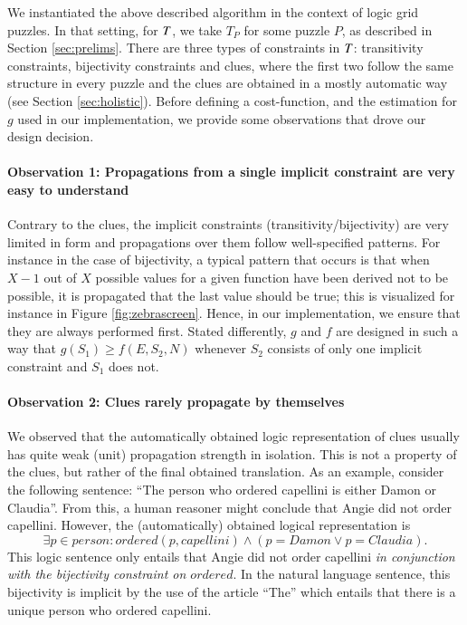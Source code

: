 We instantiated the above described algorithm in the context of logic grid puzzles.
In that setting, for $T$, we take $T_P$ for some puzzle $P$, as described in Section \ref{sec:prelims}.
There are three types of constraints in $T$: transitivity constraints, bijectivity constraints and clues, where the first two follow the same structure in every puzzle and the clues are obtained in a mostly automatic way (see Section \ref{sec:holistic}).
Before defining a cost-function, and the estimation for $g$ used in our implementation, we provide some observations that drove our design decision.

\paragraph{Observation 1: Propagations from a single implicit constraint are very easy to understand}\label{obs:1:implicitconstraints} Contrary to the clues, the implicit constraints (transitivity/bijectivity) are very limited in form and propagations over them follow well-specified patterns.
For instance in the case of bijectivity, a typical pattern that occurs is that when $X-1$ out of $X$ possible values for a given function have been derived not to be possible, it is propagated that the last value should be true; this is visualized for instance in Figure \ref{fig:zebrascreen}.
Hence, in our implementation, we ensure that they are always performed first. Stated differently, $g$ and $f$ are designed in such a way that $g(S_1)\geq f(E,S_2,N)$  whenever $S_2$ consists of only one implicit constraint and $S_1$ does not.

\paragraph{Observation 2: Clues rarely propagate by themselves}\label{obs:2:cluespropagate}
We observed that the automatically obtained logic representation of clues usually has quite weak (unit) propagation strength in isolation.
This is not a property of the clues, but rather of the final obtained translation. As an example, consider the following sentence:
``The person who ordered capellini is either Damon or Claudia''. From this, a human reasoner might conclude that Angie did not order capellini.
However, the (automatically) obtained logical representation is
\[\exists p\in \mathit{person}: \mathit{ordered}(p, \mathit{capellini})\land (p =  \mathit{Damon}\lor p =  \mathit{Claudia}).\]
This logic sentence only entails that Angie did not order capellini \emph{in conjunction with the bijectivity constraint on $ \mathit{ordered}$}.
In the natural language sentence, this bijectivity is implicit by the use of the article ``The'' which entails that there is a unique person who ordered capellini.

